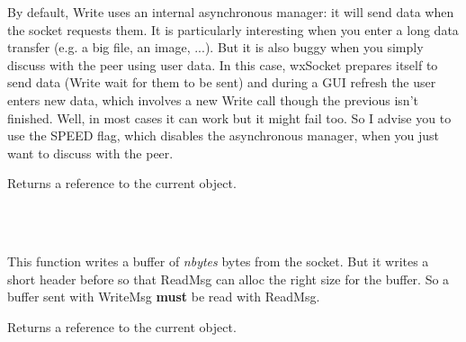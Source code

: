By default, Write uses an internal asynchronous manager: it will send data when
the socket requests them. It is particularly interesting when you enter a long
data transfer (e.g. a big file, an image, ...). But it is also buggy when you
simply discuss with the peer using user data. In this case, wxSocket prepares
itself to send data (Write wait for them to be sent) and during a GUI refresh
the user enters new data, which involves a new Write call though the previous
isn't finished. Well, in most cases it can work but it might fail too.  
So I advise you to use the SPEED flag, which disables the asynchronous manager,
when you just want to discuss with the peer.





Returns a reference to the current object.


\\
\\

%
%
\label{wxsocketbasewritemsg}


This function writes a buffer of {\it nbytes} bytes from the socket. But it
writes a short header before so that ReadMsg can alloc the right size for
the buffer. So a buffer sent with WriteMsg {\bf must} be read with ReadMsg.





Returns a reference to the current object.


\\
\\
\\


